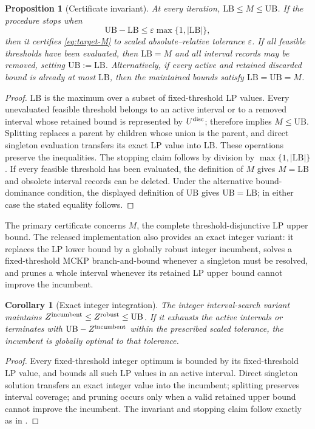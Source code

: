 \documentclass[11pt]{article}
\theoremstyle{plain}
\newtheorem{proposition}[theorem]{Proposition}
\newtheorem{corollary}[theorem]{Corollary}
\theoremstyle{definition}
\theoremstyle{remark}
\begin{document}
\begin{proposition}[Certificate invariant]\label{prop:certificate}
At every iteration,
$\mathrm{LB}\le M\le\mathrm{UB}$.  If the procedure stops when
\[
\mathrm{UB}-\mathrm{LB}\le\varepsilon\max\{1,|\mathrm{LB}|\},
\]
then it certifies \eqref{eq:target-M} to scaled absolute--relative tolerance $\varepsilon$.  If all feasible thresholds have been evaluated, then $\mathrm{LB}=M$ and all interval records may be removed, setting $\mathrm{UB}:=\mathrm{LB}$.  Alternatively, if every active and retained discarded bound is already at most $\mathrm{LB}$, then the maintained bounds satisfy $\mathrm{LB}=\mathrm{UB}=M$.
\end{proposition}
\begin{proof}
$\mathrm{LB}$ is the maximum over a subset of fixed-threshold LP values.  Every unevaluated feasible threshold belongs to an active interval or to a removed interval whose retained bound is represented by $U^{\rm disc}$;  therefore implies $M\le\mathrm{UB}$.  Splitting replaces a parent by children whose union is the parent, and direct singleton evaluation transfers its exact LP value into $\mathrm{LB}$.  These operations preserve the inequalities.  The stopping claim follows by division by $\max\{1,|\mathrm{LB}|\}$.  If every feasible threshold has been evaluated, the definition of $M$ gives $M=\mathrm{LB}$ and obsolete interval records can be deleted.  Under the alternative bound-dominance condition, the displayed definition of $\mathrm{UB}$ gives $\mathrm{UB}=\mathrm{LB}$; in either case the stated equality follows.
\end{proof}

The primary certificate concerns $M$, the complete threshold-disjunctive LP upper bound.  The released implementation also provides an exact integer variant: it replaces the LP lower bound by a globally robust integer incumbent, solves a fixed-threshold MCKP branch-and-bound whenever a singleton must be resolved, and prunes a whole interval whenever its retained LP upper bound cannot improve the incumbent.

\begin{corollary}[Exact integer integration]\label{cor:integer-integration}
The integer interval-search variant maintains
$Z^{\rm incumbent}\le Z^{\rm robust}\le\mathrm{UB}$.
If it exhausts the active intervals or terminates with $\mathrm{UB}-Z^{\rm incumbent}$ within the prescribed scaled tolerance, the incumbent is globally optimal to that tolerance.
\end{corollary}
\begin{proof}
Every fixed-threshold integer optimum is bounded by its fixed-threshold LP value, and  bounds all such LP values in an active interval.  Direct singleton solution transfers an exact integer value into the incumbent; splitting preserves interval coverage; and pruning occurs only when a valid retained upper bound cannot improve the incumbent.  The invariant and stopping claim follow exactly as in .
\end{proof}
\end{document}
